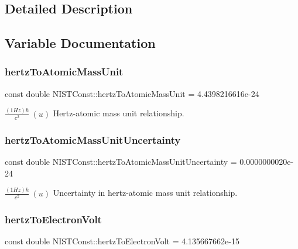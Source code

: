 \subsection{Detailed Description}


\subsection{Variable Documentation}
\mbox{\label{group___hertz_ga5e2fd7ea13ae13a34435ff0578082d34}} 
\subsubsection{\texorpdfstring{hertz\+To\+Atomic\+Mass\+Unit}{hertzToAtomicMassUnit}}
{\footnotesize\ttfamily const double N\+I\+S\+T\+Const\+::hertz\+To\+Atomic\+Mass\+Unit = 4.\+4398216616e-\/24}

$\frac{(1 Hz)h}{c^2} \ (u)$ Hertz-\/atomic mass unit relationship. \mbox{\label{group___hertz_ga7ec0e57b96db2ded3c361465c8770d71}} 
\subsubsection{\texorpdfstring{hertz\+To\+Atomic\+Mass\+Unit\+Uncertainty}{hertzToAtomicMassUnitUncertainty}}
{\footnotesize\ttfamily const double N\+I\+S\+T\+Const\+::hertz\+To\+Atomic\+Mass\+Unit\+Uncertainty = 0.\+0000000020e-\/24}

$\frac{(1 Hz)h}{c^2} \ (u)$ Uncertainty in hertz-\/atomic mass unit relationship. \mbox{\label{group___hertz_ga035f43de5d8ad8208675c53a0057d14d}} 
\subsubsection{\texorpdfstring{hertz\+To\+Electron\+Volt}{hertzToElectronVolt}}
{\footnotesize\ttfamily const double N\+I\+S\+T\+Const\+::hertz\+To\+Electron\+Volt = 4.\+135667662e-\/15}

